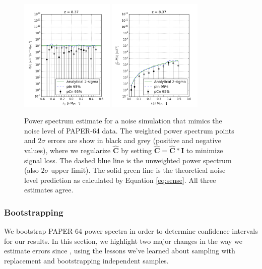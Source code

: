 \documentclass[preprint2,numberedappendix,tighten]{aastex6}  %
\begin{document}
\begin{figure}
	\centering
	\includegraphics[width=0.4\textwidth]{plots/ps_noise_pk.png}
	\includegraphics[width=0.4\textwidth]{plots/ps_noise_delta.png}
	\caption{Power spectrum estimate for a noise simulation that mimics the noise level of PAPER-64 data. The weighted power spectrum points and $2\sigma$ errors are show in black and grey (positive and negative values), where we regularize $\hat{\textbf{C}}$ by setting $\hat{\textbf{C}} = \hat{\textbf{C}} * \textbf{I}$ to minimize signal loss. The dashed blue line is the unweighted power spectrum (also $2\sigma$ upper limit). The solid green line is the theoretical noise level prediction as calculated by Equation \ref{eq:sense}. All three estimates agree.}
	\label{fig:ps_noise}
\end{figure}

\subsubsection{Bootstrapping}
\label{sec:Boot}

We bootstrap PAPER-64 power spectra in order to determine confidence intervals for our results. In this section, we highlight two major changes in the way we estimate errors since \citet{ali_et_al2015}, using the lessons we've learned about sampling with replacement and bootstrapping independent samples.
\end{document}
